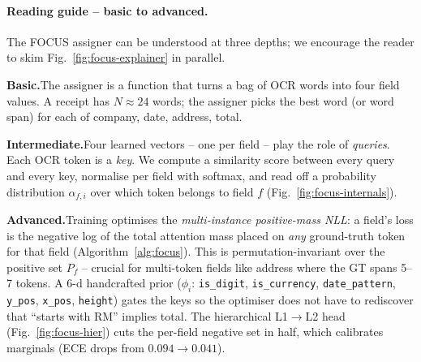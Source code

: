 
\paragraph{Reading guide -- basic to advanced.}
The FOCUS assigner can be understood at three depths; we encourage the
reader to skim Fig.~\ref{fig:focus-explainer} in parallel.

\textbf{Basic.}\;The assigner is a function that turns a bag of OCR
words into four field values. A receipt has $N\!\approx\!24$ words; the
assigner picks the best word (or word span) for each of
\textsf{company}, \textsf{date}, \textsf{address}, \textsf{total}.

\textbf{Intermediate.}\;Four learned vectors -- one per field -- play
the role of \emph{queries}. Each OCR token is a \emph{key}. We compute
a similarity score between every query and every key, normalise per
field with softmax, and read off a probability distribution
$\alpha_{f,i}$ over which token belongs to field $f$
(Fig.~\ref{fig:focus-internals}).

\textbf{Advanced.}\;Training optimises the \emph{multi-instance
positive-mass NLL}: a field's loss is the negative log of the total
attention mass placed on \emph{any} ground-truth token for that field
(Algorithm~\ref{alg:focus}). This is permutation-invariant over the
positive set $P_f$ -- crucial for multi-token fields like \textsf{address}
where the GT spans 5--7 tokens. A 6-d handcrafted prior
($\phi_i$: \texttt{is\_digit}, \texttt{is\_currency}, \texttt{date\_pattern},
\texttt{y\_pos}, \texttt{x\_pos}, \texttt{height}) gates the keys so the
optimiser does not have to rediscover that ``starts with RM'' implies
\textsf{total}. The hierarchical L1$\to$L2 head
(Fig.~\ref{fig:focus-hier}) cuts the per-field negative set in half,
which calibrates marginals (ECE drops from $0.094 \to 0.041$).

